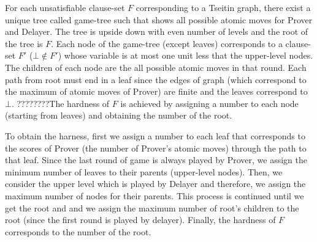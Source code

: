 \documentclass[]{book}
\begin{document}
For each unsatisfiable clause-set $F$ corresponding to a Tseitin graph, there exist a unique tree called game-tree such that shows all possible atomic moves for Prover and Delayer. The tree is upside down with even number of levels and the root of the tree is $F$. Each node of the game-tree (except leaves) corresponds to a clause-set $F'$ ($ \bot \not \in F'$) whose variable is at most one unit less that the upper-level nodes. The children of each node are the all possible atomic moves in that round. Each path from root must end in a leaf since the edges of graph (which correspond to the maximum of atomic moves of Prover) are finite and the leaves correspond to $\bot$. ????????The hardness of $F$ is achieved by assigning a number to each node (starting from leaves) and obtaining the number of the root.

To obtain the harness, first we assign a number to each leaf that corresponds to the scores of Prover (the number of Prover's atomic moves) through the path to that leaf. Since the last round of game is always played by Prover, we assign the minimum number of leaves to their parents (upper-level nodes). Then, we consider the upper level which is played by Delayer and therefore, we assign the maximum number of nodes for their parents. This process is continued until we get the root and and we assign the maximum number of root's children to the root (since the first round is played by delayer). Finally, the hardness of $F$ corresponds to the number of the root.
\end{document}
